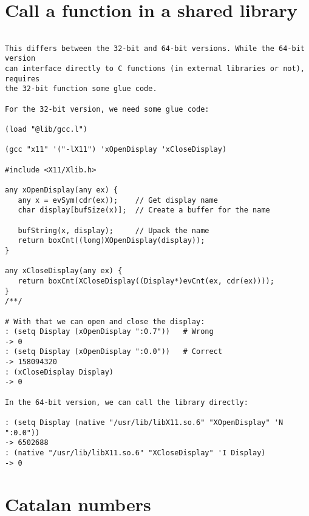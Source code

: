 \section*{Call a function in a shared library}

\begin{verbatim}

This differs between the 32-bit and 64-bit versions. While the 64-bit version
can interface directly to C functions (in external libraries or not), requires
the 32-bit function some glue code.

For the 32-bit version, we need some glue code:

(load "@lib/gcc.l")

(gcc "x11" '("-lX11") 'xOpenDisplay 'xCloseDisplay)

#include <X11/Xlib.h>

any xOpenDisplay(any ex) {
   any x = evSym(cdr(ex));    // Get display name
   char display[bufSize(x)];  // Create a buffer for the name

   bufString(x, display);     // Upack the name
   return boxCnt((long)XOpenDisplay(display));
}

any xCloseDisplay(any ex) {
   return boxCnt(XCloseDisplay((Display*)evCnt(ex, cdr(ex))));
}
/**/

# With that we can open and close the display:
: (setq Display (xOpenDisplay ":0.7"))   # Wrong
-> 0
: (setq Display (xOpenDisplay ":0.0"))   # Correct
-> 158094320
: (xCloseDisplay Display)
-> 0

In the 64-bit version, we can call the library directly:

: (setq Display (native "/usr/lib/libX11.so.6" "XOpenDisplay" 'N ":0.0"))
-> 6502688
: (native "/usr/lib/libX11.so.6" "XCloseDisplay" 'I Display)
-> 0

\end{verbatim}

\section*{Catalan numbers}

